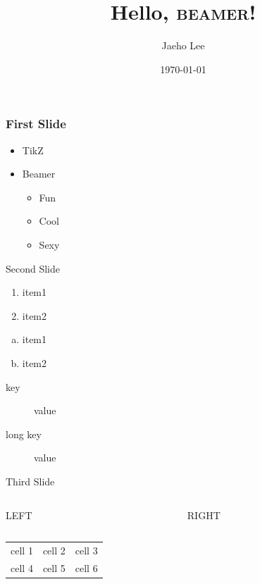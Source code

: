 \documentclass{beamer}
\title{Hello, \textsc{beamer}!}
\author{Jaeho Lee}
\date{\today}
\begin{document}
\maketitle
\begin{frame}
  \frametitle{First Slide}
  \begin{itemize}
    \item TikZ
    \item Beamer
      \begin{itemize}
        \item Fun
        \item Cool
        \item Sexy
      \end{itemize}
  \end{itemize}
\end{frame}
\begin{frame}{Second Slide}
  \begin{enumerate}
    \item item1
    \item item2
  \end{enumerate}
  \begin{enumerate}[(a)]
    \item item1
    \item item2
  \end{enumerate}
  \begin{description}
    \item[key] value
    \item[long key] value
  \end{description}
\end{frame}
\begin{frame}{Third Slide}
  \begin{columns}
    \begin{column}{0.5\textwidth}
      \LARGE LEFT
    \end{column}
    \begin{column}{0.5\textwidth}
      \LARGE RIGHT
    \end{column}
  \end{columns}
  \vspace{2cm}
  \begin{center}
    \begin{tabular}{ccc}
      cell 1 & cell 2 & cell 3\\
      cell 4 & cell 5 & cell 6
    \end{tabular}
  \end{center}
\end{frame}
\end{document}
